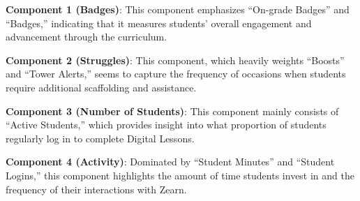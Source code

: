 \documentclass[
  number,
  preprint,
  3p,
  onecolumn]{elsarticle}
\begin{document}
\textbf{Component 1 (Badges)}: This component emphasizes ``On-grade
Badges'' and ``Badges,'' indicating that it measures students' overall
engagement and advancement through the curriculum.

\textbf{Component 2 (Struggles)}: This component, which heavily weights
``Boosts'' and ``Tower Alerts,'' seems to capture the frequency of
occasions when students require additional scaffolding and assistance.

\textbf{Component 3 (Number of Students)}: This component mainly
consists of ``Active Students,'' which provides insight into what
proportion of students regularly log in to complete Digital Lessons.

\textbf{Component 4 (Activity)}: Dominated by ``Student Minutes'' and
``Student Logins,'' this component highlights the amount of time
students invest in and the frequency of their interactions with Zearn.
\end{document}
